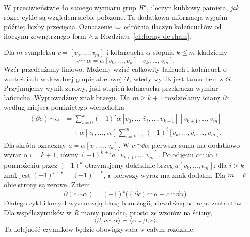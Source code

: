 W przeciwieństwie do samego wymiaru
grup $H^k$, iloczyn kubkowy pamięta,
\emph{jak} różne cykle są względem siebie
położone. Ta dodatkowa informacja
wyjaśni później liczby przecięcia.
Oznaczenie $\smile$ odróżnia
iloczyn kołańcuchów od iloczynu
zewnętrznego form $\wedge$ z
Rozdziału~\ref{ch:formy-de-rham}.

\begin{definicja}
\label{def:kapowy-16}
Dla $m$-sympleksu $c=[v_0,\ldots,v_m]$ i kołańcuchu
$\alpha$ stopnia $k\leq m$ kładziemy
\[
 c\frown\alpha=\alpha[v_0,\ldots,v_k]\,[v_k,\ldots,v_m].
\]
Wzór przedłużamy liniowo. Możemy wziąć całkowity łańcuch
i kołańcuch o wartościach w dowolnej grupie abelowej $G$;
wtedy wynik jest łańcuchem z $G$.
Przyjmujemy wynik zerowy, jeśli stopień kołańcuchu
przekracza wymiar łańcucha.
Wyprowadźmy znak brzegu. Dla $m\geq k+1$ rozdzielamy
ściany $\partial c$ według miejsca pominiętego wierzchołka:
\[
 \begin{aligned}
 (\partial c)\frown\alpha
 &=\sum_{i=0}^k(-1)^i
   \alpha[v_0,\ldots,\widehat v_i,\ldots,v_{k+1}]
                         [v_{k+1},\ldots,v_m]\\
 &\quad+\alpha[v_0,\ldots,v_k]
   \sum_{i=k+1}^m(-1)^i[v_k,\ldots,\widehat v_i,\ldots,v_m].
 \end{aligned}
\]
Dla skrótu oznaczmy $a=\alpha[v_0,\ldots,v_k]$.
W $c\frown\dd\alpha$ pierwsza suma ma dodatkowo wyraz
o $i=k+1$, równy
$(-1)^{k+1}a[v_{k+1},\ldots,v_m]$.
Po odjęciu $c\frown\dd\alpha$ i pomnożeniu przez $(-1)^k$
otrzymujemy dokładnie brzeg $a[v_k,\ldots,v_m]$:
dla $i>k$ znak jest $(-1)^{i+k}=(-1)^{i-k}$,
a pierwszy wyraz ma znak dodatni.
Dla $m=k$ obie strony są zerowe. Zatem
\begin{equation}\label{eq:kapowy-brzeg-16}
 \partial(c\frown\alpha)=(-1)^k
  \bigl((\partial c)\frown\alpha-c\frown\dd\alpha\bigr).
\end{equation}
Dlatego cykl i kocykl wyznaczają klasę homologii,
niezależną od reprezentantów. Dla współczynników w $R$
mamy ponadto, prosto ze wzorów na ściany,
\[
 \langle\beta,c\frown\alpha\rangle
 =\langle\alpha\smile\beta,c\rangle.
\]
Ta kolejność czynników będzie obowiązywała w całym rozdziale.
\end{definicja}

